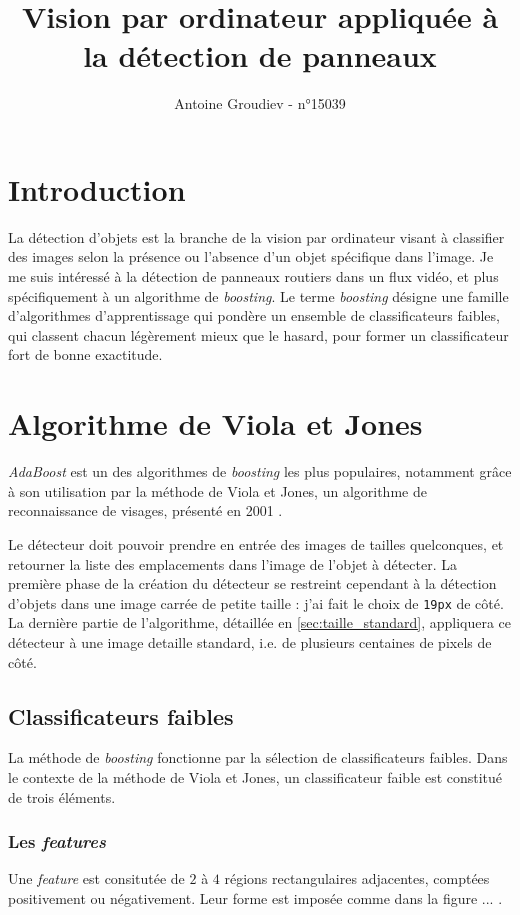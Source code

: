\documentclass[12pt,a4paper]{article}
\author{Antoine Groudiev - n°15039}
\title{Vision par ordinateur appliquée à la détection de panneaux}
\begin{document}
\maketitle

\section*{Introduction}
La détection d'objets est la branche de la vision par ordinateur visant à classifier des images selon la présence ou l'absence d'un objet spécifique dans l'image. Je me suis intéressé à la détection de panneaux routiers dans un flux vidéo, et plus spécifiquement à un algorithme de \textit{boosting}. Le terme \textit{boosting} désigne une famille d'algorithmes d'apprentissage qui pondère un ensemble de classificateurs faibles, qui classent chacun légèrement mieux que le hasard, pour former un classificateur fort de bonne exactitude.

\section{Algorithme de Viola et Jones}
\textit{AdaBoost} est un des algorithmes de \textit{boosting} les plus populaires, notamment grâce à son utilisation par la méthode de Viola et Jones, un algorithme de reconnaissance de visages, présenté en 2001 \cite{viola-jones}.

Le détecteur doit pouvoir prendre en entrée des images de tailles quelconques, et retourner la liste des emplacements dans l'image de l'objet à détecter. La première phase de la création du détecteur se restreint cependant à la détection d'objets dans une image carrée de petite taille : j'ai fait le choix de \texttt{19px} de côté. La dernière partie de l'algorithme, détaillée en \ref{sec:taille_standard}, appliquera ce détecteur à une image detaille standard, i.e. de plusieurs centaines de pixels de côté.

\subsection{Classificateurs faibles}
La méthode de \textit{boosting} fonctionne par la sélection de classificateurs faibles. Dans le contexte de la méthode de Viola et Jones, un classificateur faible est constitué de trois éléments.

\subsubsection{Les \textit{features}}
Une \textit{feature} est consitutée de $2$ à $4$ régions rectangulaires adjacentes, comptées positivement ou négativement. Leur forme est imposée comme dans la figure ... . 
\end{document}
